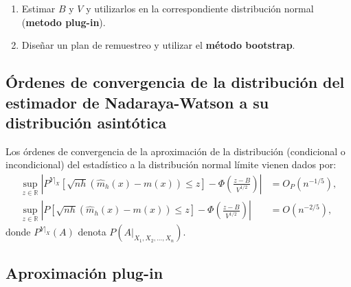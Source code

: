 \documentclass[
]{book}
\theoremstyle{break}
\theoremstyle{nonumberplain}
\begin{document}
\begin{enumerate}
\def\labelenumi{\arabic{enumi}.}
\item
  Estimar \(B\) y \(V\) y utilizarlos en la correspondiente distribución
  normal (\textbf{metodo plug-in}).
\item
  Diseñar un plan de remuestreo y utilizar el \textbf{método bootstrap}.
\end{enumerate}

\subsection{Órdenes de convergencia de la distribución del estimador de Nadaraya-Watson a su distribución asintótica}\label{uxf3rdenes-de-convergencia-de-la-distribuciuxf3n-del-estimador-de-nadaraya-watson-a-su-distribuciuxf3n-asintuxf3tica}

Los órdenes de convergencia de la aproximación de la distribución
(condicional o incondicional) del estadístico a la distribución normal
límite vienen dados por:
\[\begin{aligned}
\sup_{z\in \mathbb{R}}\left\vert P^{\left. Y\right\vert _{X}}\left[ 
\sqrt{nh}\left( \hat{m}_{h}\left( x \right) -m\left( x \right) \right) \leq z
\right] -\Phi \left( \frac{z-B}{V^{1/2}} \right) \right\vert &= O_{P}\left(
n^{-1/5} \right), \\
\sup_{z\in \mathbb{R}}\left\vert P\left[ \sqrt{nh}\left( \hat{m}
_{h}\left( x \right) -m\left( x \right) \right) \leq z\right] -\Phi \left( 
\frac{z-B}{V^{1/2}} \right) \right\vert &= O\left( n^{-2/5} \right),
\end{aligned}\]
donde \(P^{\left. Y\right\vert_{X}}\left( A \right)\) denota
\(P\left( \left. A \right\vert_{X_1,X_2,\ldots ,X_n} \right)\).

\subsection{Aproximación plug-in}\label{aproximaciuxf3n-plug-in-1}
\end{document}
